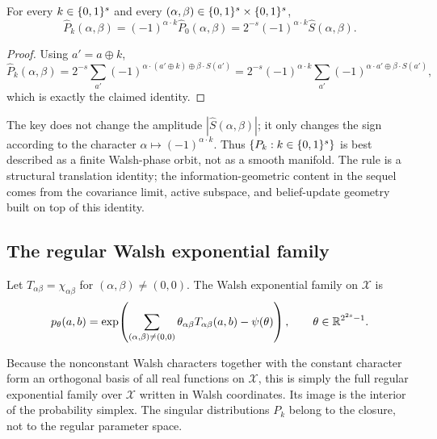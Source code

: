 \begin{lemma}\label{thm:phase-shift}
For every $k\in\{0,1\}^{s}$ and every $(\alpha,\beta)\in\{0,1\}^{s}\times\{0,1\}^{s}$,
\begin{equation}\label{eq:phase-shift}
  \widehat P_k(\alpha,\beta)
  =(-1)^{\alpha\cdot k}\widehat P_0(\alpha,\beta)
  =2^{-s}(-1)^{\alpha\cdot k}\widehat S(\alpha,\beta).
\end{equation}
\end{lemma}

\begin{proof}
Using $a'=a\oplus k$,
\[
\widehat P_k(\alpha,\beta)
=2^{-s}\sum_{a'}(-1)^{\alpha\cdot(a'\oplus k)\oplus\beta\cdot S(a')}
=2^{-s}(-1)^{\alpha\cdot k}\sum_{a'}(-1)^{\alpha\cdot a'\oplus\beta\cdot S(a')},
\]
which is exactly the claimed identity.
\end{proof}

\begin{remark}
The key does not change the amplitude $|\widehat S(\alpha,\beta)|$; it only
changes the sign according to the character $\alpha\mapsto(-1)^{\alpha\cdot k}$.
Thus $\{P_k:k\in\{0,1\}^{s}\}$ is best described as a finite Walsh-phase orbit, not as
a smooth manifold.  The rule is a structural translation identity; the
information-geometric content in the sequel comes from the covariance limit,
active subspace, and belief-update geometry built on top of this identity.
\end{remark}

\subsection{The regular Walsh exponential family}

\begin{definition}\label{def:walsh-exp}
Let $T_{\alpha\beta}=\chi_{\alpha\beta}$ for
$(\alpha,\beta)\neq(0,0)$.  The Walsh exponential family on $\mathcal X$ is
\begin{equation}\label{eq:walsh-exp}
  p_\theta(a,b)=
  \exp\!\left(\sum_{(\alpha,\beta)\neq(0,0)}
  \theta_{\alpha\beta}T_{\alpha\beta}(a,b)-\psi(\theta)\right),
  \qquad \theta\in\mathbb{R}^{2^{2s}-1}.
\end{equation}
\end{definition}

Because the nonconstant Walsh characters together with the constant character
form an orthogonal basis of all real functions on $\mathcal X$, this is simply
the full regular exponential family over $\mathcal X$ written in Walsh
coordinates.  Its image is the interior of the probability simplex.  The
singular distributions $P_k$ belong to the closure, not to the regular
parameter space.

